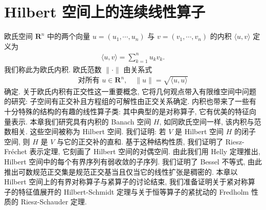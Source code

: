 \documentclass[../main.tex]{subfiles}
\begin{document}
\chapter{Hilbert 空间上的连续线性算子}\label{chapter:ch16-hilbert-operators}

欧氏空间 $\mathbf{R}^{n}$ 中的两个向量 $u=(u_{1},\cdots,u_{n})$ 与 $v=(v_{1},\cdots,v_{n})$ 的内积 $\langle u,v\rangle$ 定义为
\begin{align*}
\langle u,v\rangle=\sum_{k=1}^{n}u_{k}v_{k}.
\end{align*}
我们称此为欧氏内积. 欧氏范数 $\|\cdot\|$ 由关系式
\begin{align*}
\text{对所有 }u\in\mathbf{R}^{n},\quad\|u\|=\sqrt{\langle u,u\rangle}
\end{align*}
确定. 关于欧氏内积有正交性这一重要概念, 它将几何观点带入有限维空间中问题的研究: 子空间有正交补且方程组的可解性由正交关系确定. 内积也带来了一些有十分特殊的结构的有趣的线性算子类: 其中典型的是对称算子, 它有优美的特征向量表示. 本章我们研究具有内积的 Banach 空间 $H$, 如同欧氏空间一样, 该内积与范数相关. 这些空间被称为 Hilbert 空间. 我们证明: 若 $V$ 是 Hilbert 空间 $H$ 的闭子空间, 则 $H$ 是 $V$ 与它的正交补的直和. 基于这种结构性质, 我们证明了 Riesz-Fr\'echet 表示定理, 它刻画了 Hilbert 空间的对偶空间. 由此我们用 Helly 定理推出, Hilbert 空间中的每个有界序列有弱收敛的子序列. 我们证明了 Bessel 不等式, 由此推出可数规范正交集是规范正交基当且仅当它的线性扩张是稠密的. 本章以 Hilbert 空间上的有界对称算子与紧算子的讨论结束, 我们准备证明关于紧对称算子的特征值展开的 Hilbert-Schmidt 定理与关于恒等算子的紧扰动的 Fredholm 性质的 Riesz-Schauder 定理.














\end{document}
